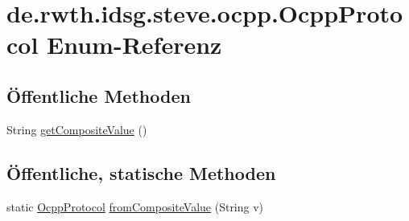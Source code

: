 \hypertarget{enumde_1_1rwth_1_1idsg_1_1steve_1_1ocpp_1_1_ocpp_protocol}{\section{de.\+rwth.\+idsg.\+steve.\+ocpp.\+Ocpp\+Protocol Enum-\/\+Referenz}
\label{enumde_1_1rwth_1_1idsg_1_1steve_1_1ocpp_1_1_ocpp_protocol}
}
\subsection*{Öffentliche Methoden}
\begin{DoxyCompactItemize}
\item 
String \hyperlink{enumde_1_1rwth_1_1idsg_1_1steve_1_1ocpp_1_1_ocpp_protocol_a95bc56bd40e0d2aa1935989a762e5501}{get\+Composite\+Value} ()
\end{DoxyCompactItemize}
\subsection*{Öffentliche, statische Methoden}
\begin{DoxyCompactItemize}
\item 
static \hyperlink{enumde_1_1rwth_1_1idsg_1_1steve_1_1ocpp_1_1_ocpp_protocol}{Ocpp\+Protocol} \hyperlink{enumde_1_1rwth_1_1idsg_1_1steve_1_1ocpp_1_1_ocpp_protocol_a002d2764bec30b836401b582a689feeb}{from\+Composite\+Value} (String v)
\end{DoxyCompactItemize}

